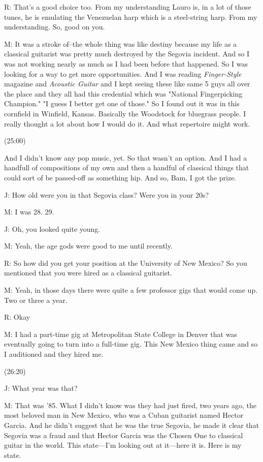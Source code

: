 \documentclass[11pt]{article}
\begin{document}
R: That's a good choice too. From my understanding Lauro is, in a lot of those tunes, he is emulating the Venezuelan harp which is a steel-string harp. From my understanding. So, good on you. 

M: It was a stroke of–the whole thing was like destiny because my life as a classical guitarist was pretty much destroyed by the Segovia incident. And so I was not working nearly as much as I had been before that happened. So I was looking for a way to get more opportunities. And I was reading \emph{Finger-Style} magazine and \emph{Acoustic Guitar} and I kept seeing these like same 5 guys all over the place and they all had this credential which was "National Fingerpicking Champion." "I guess I better get one of those." So I found out it was in this cornfield in Winfield, Kansas. Basically the Woodstock for bluegrass people. I really thought a lot about how I would do it. And what repertoire might work.

(25:00)

And I didn't know any pop music, yet. So that wasn't an option. And I had a handfull of compositions of my own and then a handful of classical things that could sort of be passed-off as something hip. And so, Bam, I got the prize. 

J: How old were you in that Segovia class? Were you in your 20s?

M: I was 28. 29.

J: Oh, you looked quite young. 

M: Yeah, the age gods were good to me until recently. 

R: So how did you get your position at the University of New Mexico? So you mentioned that you were hired as a classical guitarist. 

M: Yeah, in those days there were quite a few professor gigs that would come up. Two or three a year.  

R: Okay

M: I had a part-time gig at Metropolitan State College in Denver that was eventually going to turn into a full-time gig. This New Mexico thing came and so I auditioned and they hired me. 

(26:20)

J: What year was that?

M: That was '85. What I didn't know was they had just fired, two years ago, the most beloved man in New Mexico, who was a Cuban guitarist named Hector Garcia. And he didn't suggest that he was the true Segovia, he made it clear that Segovia was a fraud and that Hector Garcia was the Chosen One to classical guitar in the world.  This state—I'm looking out at it—here it is. Here is my state.
\end{document}
